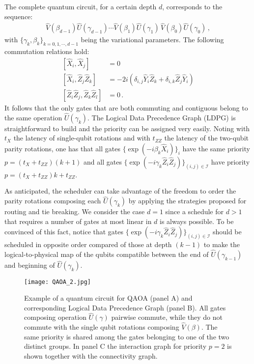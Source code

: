 \documentclass[%
onecolumn,pra,
superscriptaddress,
nofootinbib,
 amsmath,amssymb,
 aps,
11pt,
]{revtex4-1}
\begin{document}
The complete quantum circuit, for a certain depth $d$, corresponds to the sequence:
\begin{align}
\label{eq:QAOA_q_circ}
	\hat{V}(\beta_{d-1}) \hat{U}(\gamma_{d-1}) \cdots \hat{V}(\beta_1) \hat{U}(\gamma_1) \, \hat{V}(\beta_0) \hat{U}(\gamma_0) \, ,
\end{align}
with $\{\gamma_k,\beta_k\}_{k=0,1,\cdots,d-1}$ being the variational parameters. The following commutation relations hold:
\begin{align}
\label{eq:QAOA_commutations}
	\left[\hat{X}_i , \hat{X}_j\right] &= 0 \nonumber \\
	\left[\hat{X}_i , \hat{Z}_j \hat{Z}_k\right] &=
    		-2i \left( \delta_{i,j} \hat{Y}_i \hat{Z}_k + \delta_{i,k} \hat{Z}_j \hat{Y}_i \right) \nonumber\\
	\left[\hat{Z}_i \hat{Z}_j , \hat{Z}_k \hat{Z}_l\right] &= 0 \, .
\end{align}
It follows that the only gates that are both commuting and contiguous belong to the same operation $\hat{U}(\gamma_k)$. The Logical Data Precedence Graph (LDPG) is straightforward to build and the priority can be assigned very easily. Noting with $t_X$ the latency of single-qubit rotations and with $t_{ZZ}$ the latency of the two-qubit parity rotations, one has that all gates $\{\exp{(-i \beta_k  \hat{X}_i)}\}_i$ have the same priority $p=(t_X + t_{ZZ})(k+1)$ and all gates $\{\exp{(-i \gamma_k  \hat{Z}_i\hat{Z}_j)}\}_{(i,j)\in\mathcal{I}}$ have priority $p=(t_X + t_{ZZ})k + t_{ZZ}$.

As anticipated, the scheduler can take advantage of the freedom to order the parity rotations composing each $\hat{U}(\gamma_k)$ by applying the strategies proposed for routing and tie breaking. We consider the case $d=1$ since a schedule for $d>1$ that requires a number of gates at most linear in $d$ is always possible. To be convinced of this fact, notice that gates $\{\exp{(-i \gamma_k  \hat{Z}_i\hat{Z}_j)}\}_{(i,j)\in\mathcal{I}}$ should be scheduled in opposite order compared of those at depth $(k-1)$ to make the logical-to-physical map of the qubits compatible between the end of $\hat{U}(\gamma_{k-1})$ and beginning of $\hat{U}(\gamma_k)$.

\begin{figure}[t!]
\centering
\texttt{[image: QAOA\_2.jpg]}
\caption{Example of a quantum circuit for QAOA (panel A) and corresponding Logical Data Precedence Graph (panel B). All gates composing operation $\hat{U}(\gamma)$ pairwise commute, while they do not commute with the single qubit rotations composing $\hat{V}(\beta)$. The same priority is shared among the gates belonging to one of the two distinct groups. In panel C the interaction graph for priority $p=2$ is shown together with the connectivity graph.}\label{fig:QAOA}
\end{figure}
\end{document}

